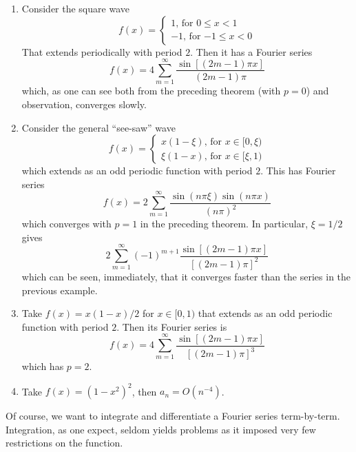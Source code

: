 \documentclass[a4paper]{article}
\begin{document}
\begin{example}
    \begin{enumerate}
        \item  Consider the square wave
        $$f(x)=\begin{cases}
            1\text{, for $0\le x<1$}\\
            -1\text{, for $-1\le x<0$}
        \end{cases}$$
        That extends periodically with period $2$.
        Then it has a Fourier series
        \begin{equation}
            f(x)=4\sum_{m=1}^\infty\frac{\sin[(2m-1)\pi x]}{(2m-1)\pi}
        \end{equation}
        which, as one can see both from the preceding theorem (with $p=0$) and observation, converges slowly.
        \item Consider the general ``see-saw'' wave
        $$f(x)=\begin{cases}
            x(1-\xi)\text{, for $x\in[0,\xi)$}\\
            \xi(1-x)\text{, for $x\in[\xi,1)$}
        \end{cases}$$
        which extends as an odd periodic function with period $2$.
        This has Fourier series
        \begin{equation}
            f(x)=2\sum_{m=1}^\infty\frac{\sin (n\pi\xi)\sin (n\pi x)}{(n\pi)^2}
        \end{equation}
        which converges with $p=1$ in the preceding theorem.
        In particular, $\xi=1/2$ gives
        $$2\sum_{m=1}^\infty(-1)^{m+1}\frac{\sin[(2m-1)\pi x]}{[(2m-1)\pi]^2}$$
        which can be seen, immediately, that it converges faster than the series in the previous example.
        \item Take $f(x)=x(1-x)/2$ for $x\in[0,1)$ that extends as an odd periodic function with period $2$.
        Then its Fourier series is
        \begin{equation}
            f(x)=4\sum_{m=1}^\infty\frac{\sin[(2m-1)\pi x]}{[(2m-1)\pi]^3}
        \end{equation}
        which has $p=2$.
        \item Take $f(x)=(1-x^2)^2$, then $a_n=O(n^{-4})$.
    \end{enumerate}
\end{example}
Of course, we want to integrate and differentiate a Fourier series term-by-term.
Integration, as one expect, seldom yields problems as it imposed very few restrictions on the function.
\end{document}
